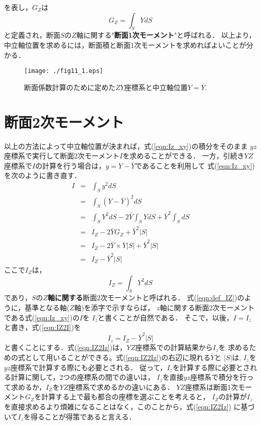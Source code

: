 \documentclass[10pt,a4j]{jarticle}
\begin{document}
を表し，$G_Z$は
\begin{equation}
	G_Z=\int_S YdS 
	\label{eqn:GZ}
\end{equation}
と定義され，断面$S$の$Z$軸に関する"{\bf 断面1次モーメント}"と呼ばれる．
以上より，中立軸位置を求めるには，断面積と断面1次モーメントを求めればよいことが分かる．
\begin{figure}[h]
	\begin{center}
	\texttt{[image: ./fig11\_1.eps]} 
	\end{center}
	\caption{
		断面係数計算のために定めた$ZY$座標系と中立軸位置$Y=\bar Y$.
	} 
	\label{fig:fig11_1}
\end{figure}
\section{断面2次モーメント}
以上の方法によって中立軸位置が決まれば，式(\ref{eqn:Iz_xy})の積分をそのまま
$yz$座標系で実行して断面2次モーメント$I$を求めることができる．
一方，引続き$YZ$座標系で$I$の計算を行う場合は，$y=Y-\bar{Y}$であることを利用して
式(\ref{eqn:Iz_xy})を次のように書き直す．
\begin{eqnarray}
	I &= &
	\int_S y^2 dS 
	\nonumber \\
	 &= &
	\int_S \left( Y-\bar{Y}\right)^2 dS 
	\nonumber \\
	 &= &
	\int_S Y^2dS -2\bar{Y}\int_S Y dS +\bar Y^2 \int_S dS
	\nonumber \\
	 &= &
	 I_Z-2\bar{Y}G_Z+\bar{Y}^2\left| S \right|
	\nonumber \\
	 &= &
	 I_Z-2\bar{Y}\times \bar{Y}\left| S \right|+\bar{Y}^2 \left| S \right|
	\nonumber \\
	 &= &
	 I_Z-\bar{Y}^2\left| S \right|
	\label{eqn:IZ2I}
\end{eqnarray}
ここで$I_Z$は，
\begin{equation}
	I_Z=\int_S Y^2 dS
	\label{eqn:def_IZ}
\end{equation}
であり，$S$の{\bf $Z$軸に関する}断面2次モーメントと呼ばれる．
式(\ref{eqn:def_IZ})のように，基準となる軸($Z$軸)を添字で示すならば，
$z$軸に関する断面2次モーメントである式(\ref{eqn:Iz_xy})の$I$を
$I_z$と書くことが自然である．
そこで，以後，$I=I_z$と書き，式(\ref{eqn:IZ2I})を
\begin{equation}
	I_z=I_Z-\bar Y^2 \left| S \right|
	\label{eqn:IZ2Iz}
\end{equation}
と書くことにする．式(\ref{eqn:IZ2Iz})は，$YZ$座標系での計算結果から$I_z$を
求めるための式として用いることができる。式(\ref{eqn:IZ2Iz})の右辺に現れる$\bar{Y}$と
$\left| S\right|$は, $I_z$を$yz$座標系で計算する際にも必要とされる．
従って，$I_z$を計算する際に必要とされる計算に関して，2つの座標系の間での違いは，
$I_z$を直接$yz$座標系で積分を行って求めるか，$I_Z$を$YZ$座標系で求めるかの違いにある．
$YZ$座標系は断面1次モーメント$G_Z$を計算する上で最も都合の座標を選ぶことを考えると，
$I_Z$の計算が$I_z$を直接求めるより煩雑になることはなく，このことから，式(\ref{eqn:IZ2Iz})
に基づいて$I_z$を得ることが得策であると言える．
\end{document}
